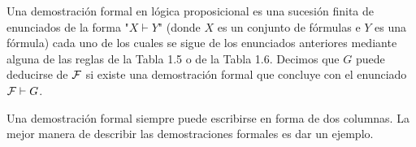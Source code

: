 \message{ !name(main.tex)}\documentclass[12pt,a4paper]{book}
\newcommand{\comillas}[1]{"#1"}
\begin{document}
    \begin{definicion}\label{def:demostracion-formal}
        Una demostración formal en lógica proposicional es una sucesión finita de enunciados de la forma \comillas{$X\vdash Y$}
        (donde $X$ es un conjunto de fórmulas e $Y$ es una fórmula) cada uno de los cuales se sigue de los enunciados anteriores
        mediante alguna de las reglas de la Tabla 1.5 o de la Tabla 1.6. Decimos que $G$ puede deducirse de $\mathcal{F}$ si existe una
        demostración formal que concluye con el enunciado $\mathcal{F}\vdash G$.
    \end{definicion}

    Una demostración formal siempre puede escribirse en forma de dos columnas. La mejor manera de describir las demostraciones
    formales es dar un ejemplo.
\end{document}
